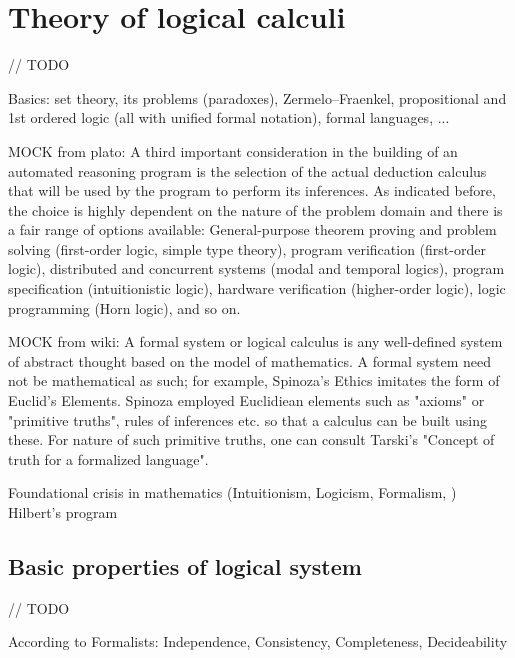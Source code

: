 \documentclass[article]{aaltoseries}
\begin{document}

\section{Theory of logical calculi}
\label{sec:formal_theory}
// TODO

Basics: set theory, its problems (paradoxes), Zermelo–Fraenkel, propositional and 1st ordered logic (all with unified formal notation), formal languages, ...


MOCK from plato: %
A third important consideration in the building of an automated reasoning program is the selection of the actual deduction calculus that will be used by the program to perform its inferences. As indicated before, the choice is highly dependent on the nature of the problem domain and there is a fair range of options available: General-purpose theorem proving and problem solving (first-order logic, simple type theory), program verification (first-order logic), distributed and concurrent systems (modal and temporal logics), program specification (intuitionistic logic), hardware verification (higher-order logic), logic programming (Horn logic), and so on.

MOCK from wiki: A formal system or logical calculus is any well-defined system of abstract thought based on the model of mathematics. A formal system need not be mathematical as such; for example, Spinoza's Ethics imitates the form of Euclid's Elements. Spinoza employed Euclidiean elements such as "axioms" or "primitive truths", rules of inferences etc. so that a calculus can be built using these. For nature of such primitive truths, one can consult Tarski's "Concept of truth for a formalized language".

Foundational crisis in mathematics (Intuitionism, Logicism, Formalism, ) Hilbert’s program


\subsection{Basic properties of logical system}
\label{sec:logic_properties}
// TODO

According to Formalists: Independence, Consistency, Completeness, Decideability
\end{document}
